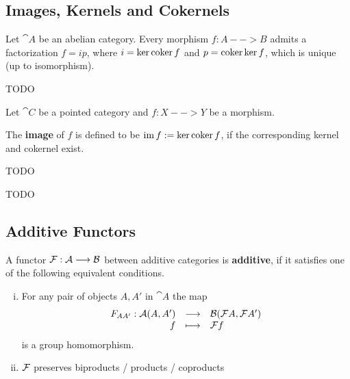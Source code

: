 	\newpage
	\subsection{Images, Kernels and Cokernels}

	\begin{theorem}
		Let $\cat{A}$ be an abelian category. Every morphism $f:A-->B$ admits a factorization $f=ip$, where $i = \ker \operatorname{coker} f$ and $p = \operatorname{coker} \ker f$, which is unique (up to isomorphism).
	\end{theorem}
	\begin{sketch}
		TODO
	\end{sketch}

	\begin{definition}[Image]
		Let $\cat{C}$ be a pointed category and $f:X-->Y$ be a morphism.

		The \textbf{image} of $f$ is defined to be $\operatorname{im} f := \ker \operatorname{coker} f$, if the corresponding kernel and cokernel exist.
	\end{definition}

	\begin{theorem}
		TODO
	\end{theorem}

	\begin{definition}[Quotient]
		TODO
	\end{definition}


	\newpage
	\subsection{Additive Functors}

	\begin{definition}
		A functor $\mathcal{F}:\mathcal{A} --> \mathcal{B}$ between additive categories is \textbf{additive}, if it satisfies one of the following equivalent conditions.
		\begin{enumerate}[(i)]
			\item{
				For any pair of objects $A,A'$ in $\cat{A}$ the map 
				\begin{equation*}
					\begin{array}{rcl}
						F_{AA'}: \mathcal{A}(A,A') &\longrightarrow& \mathcal{B}(\mathcal{F}A, \mathcal{F}A')\\
						f & \longmapsto& \mathcal{F}f
					\end{array}
				\end{equation*}
				is a group homomorphism.
			}
			\item{
				$\mathcal{F}$ preserves biproducts / products / coproducts
			}
		\end{enumerate}
	\end{definition}

